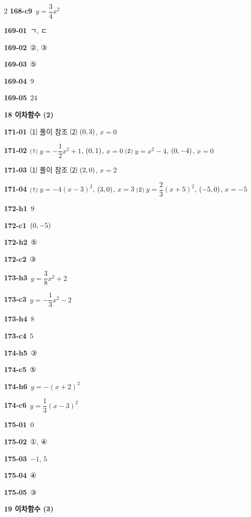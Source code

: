 \documentclass[10pt,a4paper]{article}
\begin{document}
\begin{multicols}{2}
\noindent\textbf{168-c9}\ $y=\dfrac{3}{4}x^2$\par
\noindent\textbf{169-01}\ ㄱ, ㄷ\par
\noindent\textbf{169-02}\ ②, ③\par
\noindent\textbf{169-03}\ ⑤\par
\noindent\textbf{169-04}\ $9$\par
\noindent\textbf{169-05}\ $24$\par
\noindent\textbf{18 이차함수 (2)}\par\smallskip
\noindent\textbf{171-01}\ ⑴ 풀이 참조 ⑵ $(0{,}\mkern3mu\mathopen{}3)$, $x=0$\par
\noindent\textbf{171-02}\ ⑴ $y=-\dfrac{1}{2}x^2+1$, $(0{,}\mkern3mu\mathopen{}1)$, $x=0$ ⑵ $y=x^2-4$, $(0{,}\mkern3mu\mathopen{}-4)$, $x=0$\par
\noindent\textbf{171-03}\ ⑴ 풀이 참조 ⑵ $(2{,}\mkern3mu\mathopen{}0)$, $x=2$\par
\noindent\textbf{171-04}\ ⑴ $y=-4(x-3)^2$, $(3{,}\mkern3mu\mathopen{}0)$, $x=3$ ⑵ $y=\dfrac{2}{3}(x+5)^2$, $(-5{,}\mkern3mu\mathopen{}0)$, $x=-5$\par
\noindent\textbf{172-h1}\ $9$\par
\noindent\textbf{172-c1}\ $(0{,}\mkern3mu\mathopen{}-5)$\par
\noindent\textbf{172-h2}\ ⑤\par
\noindent\textbf{172-c2}\ ③\par
\noindent\textbf{173-h3}\ $y=\dfrac{3}{8}x^2+2$\par
\noindent\textbf{173-c3}\ $y=-\dfrac{1}{3}x^2-2$\par
\noindent\textbf{173-h4}\ $8$\par
\noindent\textbf{173-c4}\ $5$\par
\noindent\textbf{174-h5}\ ③\par
\noindent\textbf{174-c5}\ ⑤\par
\noindent\textbf{174-h6}\ $y=-(x+2)^2$\par
\noindent\textbf{174-c6}\ $y=\dfrac{1}{3}(x-3)^2$\par
\noindent\textbf{175-01}\ $0$\par
\noindent\textbf{175-02}\ ①, ④\par
\noindent\textbf{175-03}\ $-1$, $5$\par
\noindent\textbf{175-04}\ ④\par
\noindent\textbf{175-05}\ ③\par
\noindent\textbf{19 이차함수 (3)}\par\smallskip

\end{multicols}
\end{document}
